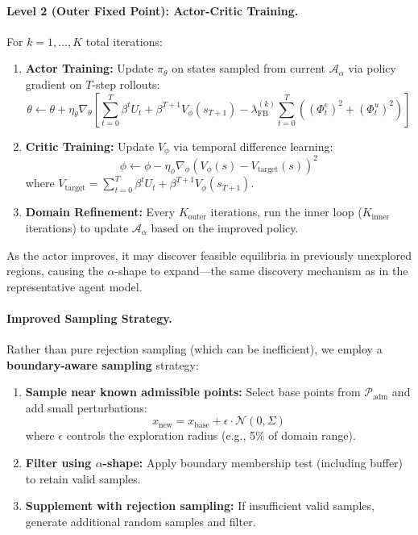\paragraph{Level 2 (Outer Fixed Point): Actor-Critic Training.}
For $k = 1, \ldots, K$ total iterations:
\begin{enumerate}
    \item \textbf{Actor Training:} Update $\pi_\theta$ on states sampled from current $\mathcal{A}_\alpha$ via policy gradient on $T$-step rollouts:
    \begin{equation}
        \theta \leftarrow \theta + \eta_\theta \nabla_\theta \left[ \sum_{t=0}^{T} \beta^t U_t + \beta^{T+1} V_\phi(s_{T+1}) - \lambda_{\text{FB}}^{(k)} \sum_{t=0}^{T} \left( (\Phi^e_t)^2 + (\Phi^u_t)^2 \right) \right]
    \end{equation}
    
    \item \textbf{Critic Training:} Update $V_\phi$ via temporal difference learning:
    \begin{equation}
        \phi \leftarrow \phi - \eta_\phi \nabla_\phi \left( V_\phi(s) - V_{\text{target}}(s) \right)^2
    \end{equation}
    where $V_{\text{target}} = \sum_{t=0}^{T} \beta^t U_t + \beta^{T+1} V_\phi(s_{T+1})$.
    
    \item \textbf{Domain Refinement:} Every $K_{\text{outer}}$ iterations, run the inner loop ($K_{\text{inner}}$ iterations) to update $\mathcal{A}_\alpha$ based on the improved policy.
\end{enumerate}

As the actor improves, it may discover feasible equilibria in previously unexplored regions, causing the $\alpha$-shape to expand---the same discovery mechanism as in the representative agent model.

\paragraph{Improved Sampling Strategy.}
Rather than pure rejection sampling (which can be inefficient), we employ a \textbf{boundary-aware sampling} strategy:
\begin{enumerate}
    \item \textbf{Sample near known admissible points:} Select base points from $\mathcal{P}_{\text{adm}}$ and add small perturbations:
    \begin{equation}
        x_{\text{new}} = x_{\text{base}} + \epsilon \cdot \mathcal{N}(0, \Sigma)
    \end{equation}
    where $\epsilon$ controls the exploration radius (e.g., 5\% of domain range).
    
    \item \textbf{Filter using $\alpha$-shape:} Apply boundary membership test (including buffer) to retain valid samples.
    
    \item \textbf{Supplement with rejection sampling:} If insufficient valid samples, generate additional random samples and filter.
\end{enumerate}

